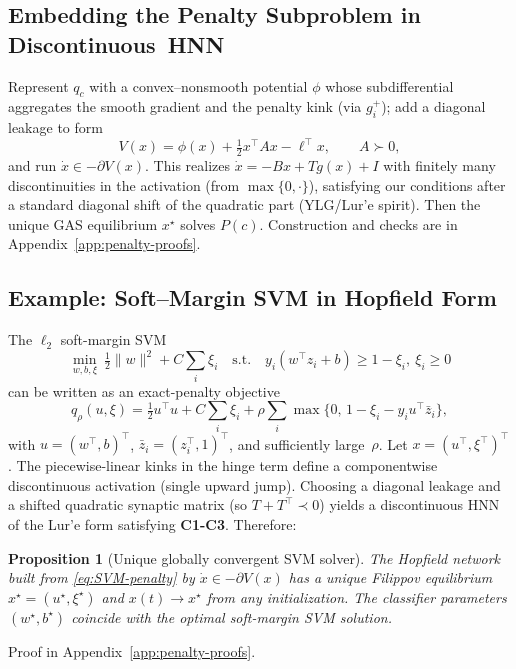 \documentclass[journal]{IEEEtran}
\newtheorem{proposition}{Proposition}
\begin{document}
\subsection{Embedding the Penalty Subproblem in Discontinuous~HNN}
Represent \(q_c\) with a convex–nonsmooth potential \(\phi\) whose subdifferential aggregates the smooth gradient and the penalty kink (via \(g_i^+\)); add a diagonal leakage to form
\begin{equation}\label{eq:penalty-V}
  V(x)=\phi(x)+\tfrac12 x^\top A x - \ell^\top x,\qquad A\succ0,
\end{equation}
and run \(\dot x\in -\partial V(x)\). This realizes \(\dot x=-Bx+T g(x)+I\) 
with finitely many discontinuities in the activation (from \(\max\{0,\cdot\}\)), 
satisfying our conditions after a standard diagonal shift of the quadratic part (YLG/Lur’e spirit). 
Then the unique GAS equilibrium \(x^\star\) solves \(P(c)\). 
Construction and checks are in Appendix~\ref{app:penalty-proofs}.

\subsection{Example: Soft–Margin SVM in Hopfield Form}\label{sec:SVM-HNN}
The \(\ell_2\) soft-margin SVM
\begin{equation}\label{eq:SVM-primal}
  \min_{w,b,\xi}\ \tfrac12\|w\|^2 + C\sum_i \xi_i\quad \text{s.t.}\quad 
  y_i(w^\top z_i + b) \ge 1-\xi_i,\ \xi_i\ge 0
\end{equation}
can be written as an exact-penalty objective
\begin{equation}\label{eq:SVM-penalty}
  q_\rho(u,\xi)=\tfrac12 u^\top u + C\sum_i \xi_i + \rho\sum_i \max\{0,\,1-\xi_i-y_i u^\top\bar z_i\},
\end{equation}
with \(u=(w^\top,b)^\top\), \(\bar z_i=(z_i^\top,1)^\top\), and sufficiently large~\(\rho\).
Let \(x=(u^\top,\xi^\top)^\top\). The piecewise-linear kinks in the hinge term define a componentwise discontinuous activation (single upward jump). Choosing a diagonal leakage and a shifted quadratic synaptic matrix (so \(T+T^\top\prec0\)) yields a discontinuous HNN of the Lur’e form satisfying \textbf{C1-C3}. Therefore:
\begin{proposition}[Unique globally convergent SVM solver]\label{prop:SVM}
The Hopfield network built from \eqref{eq:SVM-penalty} by \(\dot x\in -\partial V(x)\) has a unique Filippov equilibrium \(x^\star=(u^\star,\xi^\star)\) and \(x(t)\to x^\star\) from any initialization. 
The classifier parameters \((w^\star,b^\star)\) coincide with the optimal soft-margin SVM solution. 
\end{proposition}
Proof in Appendix~\ref{app:penalty-proofs}.
\end{document}

